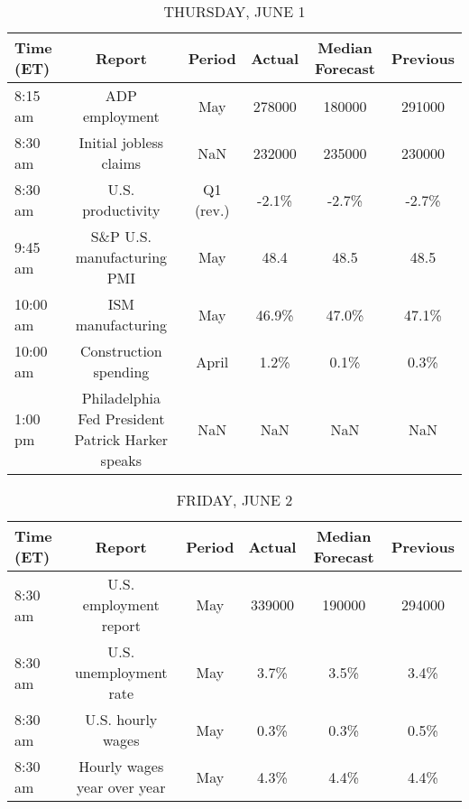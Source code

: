 \documentclass{article}%
\begin{document}
%


\begin{table}[htbp]%
\caption{THURSDAY, JUNE 1}%
\centering%
\begin{adjustbox}{width=1\textwidth}%
\begin{tabular}{lccccc}
\toprule
Time (ET) &                                           Report &    Period & Actual & Median Forecast & Previous \\
\midrule
  8:15 am &                                   ADP employment &       May & 278000 &          180000 &   291000 \\
  8:30 am &                           Initial jobless claims &       NaN & 232000 &          235000 &   230000 \\
  8:30 am &                                U.S. productivity & Q1 (rev.) &  -2.1\% &           -2.7\% &    -2.7\% \\
  9:45 am &                       S\&P U.S. manufacturing PMI &       May &   48.4 &            48.5 &     48.5 \\
 10:00 am &                                ISM manufacturing &       May &  46.9\% &           47.0\% &    47.1\% \\
 10:00 am &                            Construction spending &     April &   1.2\% &            0.1\% &     0.3\% \\
  1:00 pm & Philadelphia Fed President Patrick Harker speaks &       NaN &    NaN &             NaN &      NaN \\
\bottomrule
\end{tabular}
%
\end{adjustbox}%
\end{table}

%


\begin{table}[htbp]%
\caption{FRIDAY, JUNE 2}%
\centering%
\begin{adjustbox}{width=1\textwidth}%
\begin{tabular}{lccccc}
\toprule
Time (ET) &                      Report & Period & Actual & Median Forecast & Previous \\
\midrule
  8:30 am &      U.S. employment report &    May & 339000 &          190000 &   294000 \\
  8:30 am &      U.S. unemployment rate &    May &   3.7\% &            3.5\% &     3.4\% \\
  8:30 am &           U.S. hourly wages &    May &   0.3\% &            0.3\% &     0.5\% \\
  8:30 am & Hourly wages year over year &    May &   4.3\% &            4.4\% &     4.4\% \\
\bottomrule
\end{tabular}
%
\end{adjustbox}%
\end{table}
\end{document}
